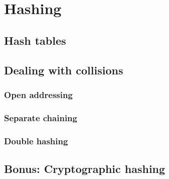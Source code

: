 \chapter{Hashing}
\label{chap:hashing}

\section{Hash tables}

\section{Dealing with collisions}

\subsection{Open addressing}
\subsection{Separate chaining}
\subsection{Double hashing}

\section{Bonus: Cryptographic hashing}